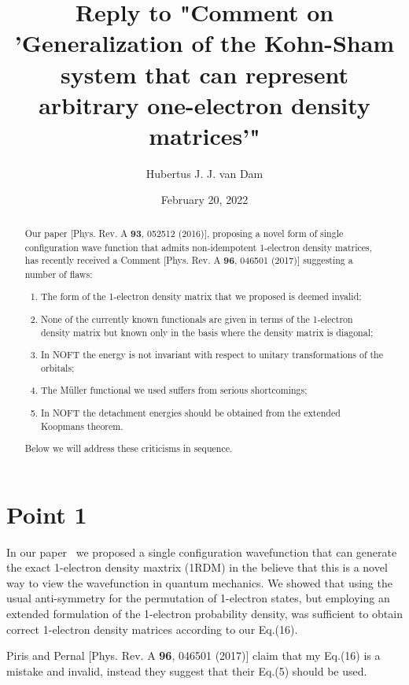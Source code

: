 \documentclass[pra]{revtex4-1}
\begin{document}
\title{Reply to "Comment on 'Generalization of the Kohn-Sham system that can
       represent arbitrary one-electron density matrices'"}
\author{Hubertus J. J. van Dam}
\date{February 20, 2022}

\begin{abstract}
Our paper [Phys. Rev. A {\bf 93}, 052512 (2016)], proposing a novel form of
single configuration wave function that admits non-idempotent 1-electron
density matrices, has recently received a Comment [Phys. Rev. A {\bf 96},
046501 (2017)] suggesting a number of flaws:
\begin{enumerate}
\item The form of the 1-electron density matrix that we proposed is deemed
      invalid;
\item None of the currently known functionals are given in terms of the
      1-electron density matrix but known only in the basis where the
      density matrix is diagonal;
\item In NOFT the energy is not invariant with respect to unitary
      transformations of the orbitals;
\item The M{\"u}ller functional we used suffers from serious shortcomings;
\item In NOFT the detachment energies should be obtained from the extended
      Koopmans theorem.
\end{enumerate}
Below we will address these criticisms in sequence.
\end{abstract}

\maketitle

\section{Point 1}

In our paper~\cite{van_Dam_2016} we proposed a single configuration wavefunction
that can generate the exact 1-electron density maxtrix (1RDM) in the believe
that this is a novel way to view the wavefunction in quantum mechanics.
We showed that using the usual anti-symmetry for the permutation of 1-electron
states, but employing an extended formulation of the 1-electron probability
density, was sufficient to obtain correct 1-electron density matrices
according to our Eq.(16). 

Piris and Pernal [Phys. Rev. A {\bf 96}, 046501 (2017)] claim that my Eq.(16) is
a mistake and invalid, instead they suggest that their Eq.(5) should be used.
\end{document}
